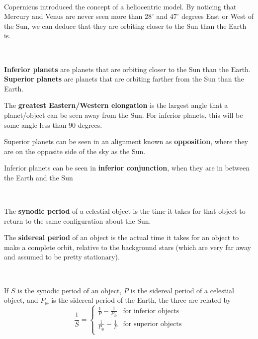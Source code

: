 \documentclass{article}
\begin{document}
\begin{example}
\

Copernicus introduced the concept of a heliocentric model. By noticing that Mercury and Venus are never seen more than $28^\circ$ and $47^\circ$ degrees East or West of the Sun, we can deduce that they are orbiting closer to the Sun than the Earth is.
\end{example}

\begin{definition}
\

\textbf{Inferior planets} are planets that are orbiting closer to the Sun than the Earth. \textbf{Superior planets} are planets that are orbiting farther from the Sun than the Earth.

The \textbf{greatest Eastern/Western elongation} is the largest angle that a planet/object can be seen away from the Sun. For inferior planets, this will be some angle less than $90$ degrees.

Superior planets can be seen in an alignment known as \textbf{opposition}, where they are on the opposite side of the sky as the Sun.

Inferior planets can be seen in \textbf{inferior conjunction}, when they are in between the Earth and the Sun 
\end{definition}

\begin{definition}
\

The \textbf{synodic period} of a celestial object is the time it takes for that object to return to the same configuration about the Sun.

The \textbf{sidereal period} of an object is the actual time it takes for an object to make a complete orbit, relative to the background stars (which are very far away and assumed to be pretty stationary).
\end{definition}

\begin{theorem}
\

If $S$ is the synodic period of an object, $P$ is the sidereal period of a celestial object, and $P_\oplus$ is the sidereal period of the Earth, the three are related by $$\frac{1}{S} = \begin{cases}
    \frac{1}{P} - \frac{1}{P_\oplus} & \text{for inferior objects}\\
    \frac{1}{P_\oplus} - \frac{1}{P} & \text{for superior objects}\\
\end{cases} $$
\end{theorem}
\end{document}
